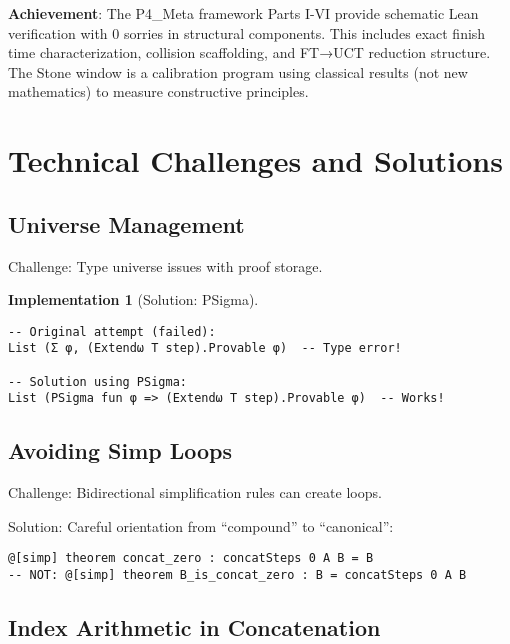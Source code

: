 \documentclass[11pt]{article}
\newif\iffullversion
\theoremstyle{definition}
\newtheorem{implementation}[theorem]{Implementation}
\theoremstyle{remark}
\begin{document}
\begin{mdframed}[style=achievement]
\textbf{Achievement}: The P4\_Meta framework Parts I-VI provide schematic Lean verification with 0 sorries in structural components. This includes exact finish time characterization, collision scaffolding, and FT→UCT reduction structure. The Stone window is a calibration program using classical results (not new mathematics) to measure constructive principles.
\end{mdframed}
\iffullversion
\section{Technical Challenges and Solutions}

\subsection{Universe Management}

Challenge: Type universe issues with proof storage.

\begin{implementation}[Solution: PSigma]
\begin{lstlisting}[language={}]
-- Original attempt (failed):
List (Σ φ, (Extendω T step).Provable φ)  -- Type error!

-- Solution using PSigma:
List (PSigma fun φ => (Extendω T step).Provable φ)  -- Works!
\end{lstlisting}
\end{implementation}

\subsection{Avoiding Simp Loops}

Challenge: Bidirectional simplification rules can create loops.

Solution: Careful orientation from ``compound'' to ``canonical'':
\begin{lstlisting}[language={}]
@[simp] theorem concat_zero : concatSteps 0 A B = B
-- NOT: @[simp] theorem B_is_concat_zero : B = concatSteps 0 A B
\end{lstlisting}

\subsection{Index Arithmetic in Concatenation}
\end{document}
